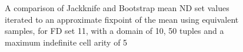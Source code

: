 \begin{figure}
\begin{minipage}{7cm}
\centerline{}
\end{minipage}
\hfill
\begin{minipage}{7cm}
\centerline{}
\end{minipage}
\caption{\label{graph:7.2} {A comparison of Jackknife and
Bootstrap mean ND set values iterated to an approximate fixpoint of
the mean using equivalent samples, for FD set 11, with a domain of 10,
50 tuples and a maximum indefinite cell arity of 5}}
\end{figure}


